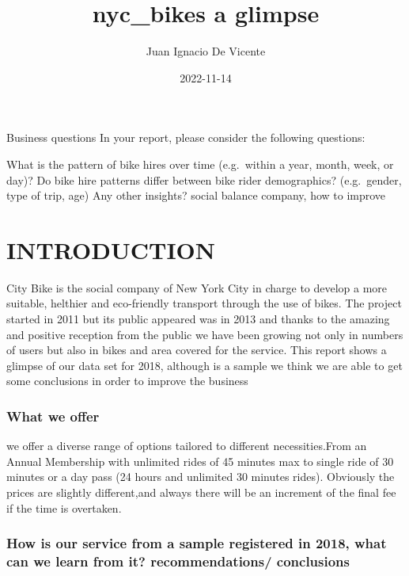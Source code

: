 \documentclass[
]{article}
\title{nyc\_bikes a glimpse}
\author{Juan Ignacio De Vicente}
\date{2022-11-14}
\begin{document}
\maketitle

Business questions In your report, please consider the following
questions:

What is the pattern of bike hires over time (e.g.~within a year, month,
week, or day)? Do bike hire patterns differ between bike rider
demographics? (e.g.~gender, type of trip, age) Any other insights?
social balance company, how to improve

\hypertarget{introduction}{%
\section{INTRODUCTION}\label{introduction}}

City Bike is the social company of New York City in charge to develop a
more suitable, helthier and eco-friendly transport through the use of
bikes. The project started in 2011 but its public appeared was in 2013
and thanks to the amazing and positive reception from the public we have
been growing not only in numbers of users but also in bikes and area
covered for the service. This report shows a glimpse of our data set for
2018, although is a sample we think we are able to get some conclusions
in order to improve the business

\hypertarget{what-we-offer}{%
\subsubsection{What we offer}\label{what-we-offer}}

we offer a diverse range of options tailored to different
necessities.From an Annual Membership with unlimited rides of 45 minutes
max to single ride of 30 minutes or a day pass (24 hours and unlimited
30 minutes rides). Obviously the prices are slightly different,and
always there will be an increment of the final fee if the time is
overtaken.

\hypertarget{how-is-our-service-from-a-sample-registered-in-2018-what-can-we-learn-from-it-recommendations-conclusions}{%
\subsubsection{How is our service from a sample registered in 2018, what
can we learn from it? recommendations/
conclusions}\label{how-is-our-service-from-a-sample-registered-in-2018-what-can-we-learn-from-it-recommendations-conclusions}}
\end{document}
